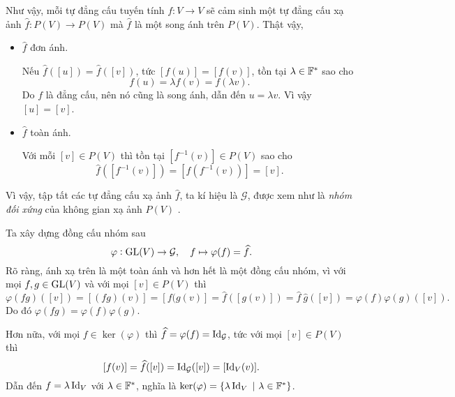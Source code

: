 \begin{comment*}
Như vậy, mỗi tự đẳng cấu tuyến tính $f: V \to V$ sẽ cảm sinh một tự đẳng cấu xạ ảnh $\widehat{f}: P(V) \to P(V)$ mà $\widehat{f}$ là một song ánh trên $P(V)$. 
Thật vậy, 
\begin{itemize}
    \item $\widehat{f}$ đơn ánh.
    
        Nếu $\widehat{f}([u]) = \widehat{f}([v])$, tức $[f(u)] = [f(v)]$, tồn tại $\lambda \in \F^*$ sao cho \[f(u) = \lambda f(v) = f(\lambda v).\] Do $f$ là đẳng cấu, nên nó cũng là song ánh, dẫn đến $u = \lambda v$. Vì vậy $[u] = [v]$.    
    \item $\widehat{f}$ toàn ánh.
    
    Với mỗi $[v] \in P(V)$ thì tồn tại $[f^{-1}(v)] \in P(V)$ sao cho \[\widehat{f}([f^{-1}(v)]) = [f(f^{-1}(v))] = [v].\]
\end{itemize}
Vì vậy, tập tất các tự đẳng cấu xạ ảnh $\widehat{f}$, ta kí hiệu là $\mathcal{G}$, được xem như là \textit{nhóm đối xứng} của không gian xạ ảnh $P(V)$ .
\end{comment*}

Ta xây dựng đồng cấu nhóm sau
\[\varphi: \operatorname{GL}(V) \to \mathcal{G}, \quad f \mapsto \varphi(f) = \widehat{f}.\]
Rõ ràng, ánh xạ trên là một toàn ánh và hơn hết là một đồng cấu nhóm, vì với mọi $f, g \in \operatorname{GL}(V)$ và với mọi $[v] \in P(V)$ thì 
\[\varphi(fg)([v])=[(fg)(v)] = [f(g(v)] = \widehat{f}([g(v)])=\widehat{f}~\widehat{g}([v]) = \varphi(f)\varphi(g)([v]).\]
Do đó $\varphi(fg) = \varphi(f)\varphi(g)$.

Hơn nữa, với mọi $f\in \ker(\varphi)$ thì $\widehat{f} = \varphi(f) = \operatorname{Id}_{\mathcal{G}}$, tức với mọi $[v] \in P(V)$ thì \[[f(v)] = \widehat{f}([v]) = \operatorname{Id}_{\mathcal{G}}([v]) = [\operatorname{Id}_V(v)].\]
Dẫn đến $f = \lambda \operatorname{Id}_V$ với $\lambda \in \mathbb{F}^*$, nghĩa là $\ker(\varphi) = \{\lambda \operatorname{Id}_V~|~\lambda \in \mathbb{F}^*\}$.

